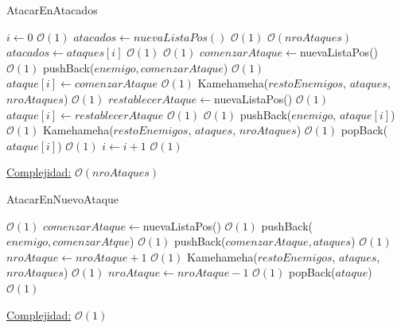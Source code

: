\begin{algorithm}
\caption{AtacarEnAtacados}
\begin{algorithmic}
\State $i \gets 0$ \Comment $\mathcal{O}(1)$
\State $atacados \gets nuevaListaPos()$ \Comment $\mathcal{O}(1)$
 \Comment $\mathcal{O}(nroAtaques)$
	\State $atacados \gets ataques[i]$ \Comment $\mathcal{O}(1)$
	 \Comment $\mathcal{O}(1)$
		\State $comenzarAtaque \gets $nuevaListaPos() \Comment $\mathcal{O}(1)$
		\State pushBack($enemigo, comenzarAtaque$) \Comment $\mathcal{O}(1)$
		\State $ataque[i] \gets 	comenzarAtaque$ \Comment $\mathcal{O}(1)$
		\State Kamehameha($restoEnemigos$, $ataques$, $nroAtaques$) \Comment $\mathcal{O}(1)$
		\State $restablecerAtaque \gets $nuevaListaPos() \Comment $\mathcal{O}(1)$
		\State $ataque[i] \gets 	restablecerAtaque$ \Comment $\mathcal{O}(1)$
	 \Comment $\mathcal{O}(1)$
		\State pushBack($enemigo$, $ataque[i]$) \Comment $\mathcal{O}(1)$
		\State Kamehameha($restoEnemigos$, $ataques$, $nroAtaques$) \Comment $\mathcal{O}(1)$
		\State popBack($ataque[i]$) \Comment $\mathcal{O}(1)$
	\EndIf
	\State $i \gets i + 1$ \Comment $\mathcal{O}(1)$
\EndWhile
\EndFunction
\end{algorithmic}
\underline{Complejidad:} $\mathcal{O}(nroAtaques)$\\
    
\end{algorithm}
 \newpage

\begin{algorithm}
\caption{AtacarEnNuevoAtaque}
\begin{algorithmic}

 \Comment $\mathcal{O}(1)$
	\State $comenzarAtaque \gets $nuevaListaPos() \Comment $\mathcal{O}(1)$
	\State pushBack($enemigo, comenzarAtque$) \Comment $\mathcal{O}(1)$
	\State pushBack($comenzarAtaque, ataques$) \Comment $\mathcal{O}(1)$
	\State $nroAtaque \gets nroAtaque + 1$ \Comment $\mathcal{O}(1)$
	\State Kamehameha($restoEnemigos$, $ataques$, $nroAtaques$) \Comment $\mathcal{O}(1)$
	\State $nroAtaque \gets 	nroAtaque - 1$ \Comment $\mathcal{O}(1)$
	\State popBack($ataque$) \Comment $\mathcal{O}(1)$
\EndIf

\EndFunction
\end{algorithmic}
\underline{Complejidad:} $\mathcal{O}(1)$\\
\end{algorithm}

